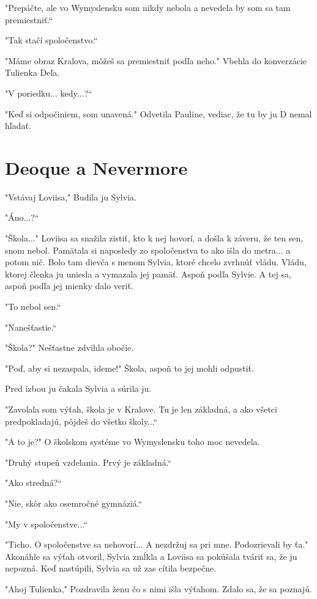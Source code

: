 \documentclass{book}
\begin{document}
"$ $Prepáčte, ale vo Wymyslensku som nikdy nebola a nevedela by som sa tam premiestniť.“

"$ $Tak stačí spoločenstvo.“

"$ $Máme obraz Kralova, môžeš sa premiestniť podľa neho."$ $ Vbehla do konverzácie Tulienka Deľa.

"$ $V poriedku... kedy...?“

"$ $Keď si odpočiniem, som unavená."$ $ Odvetila Pauline, vediac, že tu by ju D nemal hľadať.

\chapter{Deoque a Nevermore}

"$ $Vstávaj Loviisa,"$ $ Budila ju Sylvia.

"$ $Áno...?“

"$ $Škola..."$ $ Loviisa sa snažila zistiť, kto k nej hovorí, a došla k záveru, že ten sen, snom nebol. Pamätala si naposledy zo spoločenstva to ako išla do metra... a potom nič. Bolo tam dievča s menom Sylvia, ktoré chcelo zvrhnúť vládu. Vládu, ktorej členka ju uniesla a vymazala jej pamäť. Aspoň podľa Sylvie. A tej sa, aspoň podľa jej mienky dalo veriť.

"$ $To nebol sen.“

"$ $Nanešťastie.“

"$ $Škola?"$ $ Nešťastne zdvihla obočie.

"$ $Poď, aby si nezaspala, ideme!"$ $ Škola, aspoň to jej mohli odpustiť.

Pred izbou ju čakala Sylvia a súrila ju.

"$ $Zavolala som výťah, škola je v Kralove. Tu je len základná, a ako všetci predpokladajú, pôjdeš do všetko školy...“

"$ $A to je?"$ $ O školskom systéme vo Wymyslensku toho moc nevedela.

"$ $Druhý stupeň vzdelania. Prvý je základná.“

"$ $Ako stredná?“

"$ $Nie, skôr ako osemročné gymnáziá.“

"$ $My v spoločenstve...“

"$ $Ticho. O spoločenstve sa nehovorí... A nezdržuj sa pri mne. Podozrievali by ťa."$ $ Akonáhle sa výťah otvoril, Sylvia zmĺkla a Loviisa sa pokúšala tváriť sa, že ju nepozná. Keď nastúpili, Sylvia sa už zas cítila bezpečne.

"$ $Ahoj Tulienka,"$ $ Pozdravila ženu čo s nimi išla výťahom. Zdalo sa, že sa poznajú.
\end{document}
